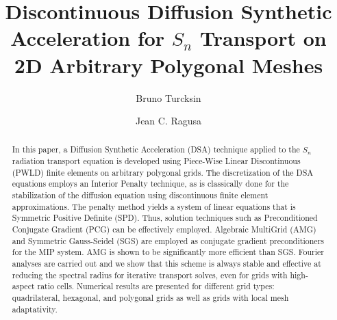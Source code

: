 \documentclass[preprint,10pt]{elsarticle}
\renewcommand{\(}{\left(}
\renewcommand{\)}{\right)}
\renewcommand{\[}{\left[}
\renewcommand{\]}{\right]}
\newcommand{\sn}{\ensuremath{S_n}\xspace}
\begin{document}
\begin{frontmatter}

\title{Discontinuous Diffusion Synthetic Acceleration for \sn Transport on
2D Arbitrary Polygonal Meshes}

\author{Bruno Turcksin }

\author{Jean C. Ragusa}

\address[label1]{Department of Nuclear Engineering, Texas A\&M University 
  College Station, TX 77843, USA }


\begin{abstract}
	In this paper, a Diffusion Synthetic Acceleration (DSA) technique applied to the \sn radiation transport equation
	is developed using Piece-Wise Linear Discontinuous (PWLD) finite elements on arbitrary polygonal grids.
%	
  The discretization of the DSA equations employs an Interior Penalty technique, as is classically done for the stabilization of  
  the diffusion equation using discontinuous finite element approximations.
  The penalty method yields a system of linear equations that  
  is Symmetric Positive Definite (SPD). Thus, solution techniques such as Preconditioned 
	Conjugate Gradient (PCG) can be effectively employed. 
	Algebraic MultiGrid (AMG) and Symmetric Gauss-Seidel (SGS) are employed as conjugate gradient preconditioners for the MIP 
	system. AMG is shown to be significantly more efficient than SGS.
%
	Fourier analyses are carried out and we show that this scheme is
  always stable and effective at reducing the spectral radius for iterative transport
  solves, even for grids with high-aspect ratio cells.
  Numerical results are presented for different grid types: quadrilateral, hexagonal, and polygonal grids as well as grids
	with local mesh adaptativity. 
%
\end{abstract}


\end{frontmatter}
\end{document}
